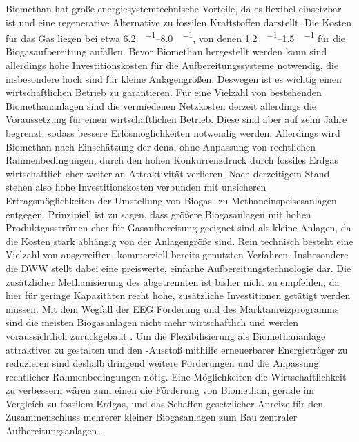 Biomethan hat große energiesystemtechnische Vorteile, da es flexibel einsetzbar ist und eine regenerative Alternative zu fossilen Kraftstoffen darstellt. Die Kosten für das Gas liegen bei etwa \SIrange{6,2}{8,0}{\ct\per\kwh}, von denen \SIrange{1,2}{1,5}{\ct\per\kwh} für die Biogasaufbereitung anfallen. Bevor Biomethan hergestellt werden kann sind allerdings hohe Investitionskosten für die Aufbereitungssysteme notwendig, die insbesondere hoch sind für kleine Anlagengrößen. Deswegen ist es wichtig einen wirtschaftlichen Betrieb zu garantieren. Für eine Vielzahl von bestehenden Biomethananlagen sind die vermiedenen Netzkosten derzeit allerdings die Voraussetzung für einen wirtschaftlichen Betrieb. Diese sind aber auf zehn Jahre begrenzt, sodass bessere Erlösmöglichkeiten notwendig werden. Allerdings wird Biomethan nach Einschätzung der dena, ohne Anpassung von rechtlichen Rahmenbedingungen, durch den hohen Konkurrenzdruck durch fossiles Erdgas wirtschaftlich eher weiter an Attraktivität verlieren.  \parencite{dena2018} \newline
Nach derzeitigem Stand stehen also hohe Investitionskosten verbunden mit unsicheren Ertragsmöglichkeiten der Umstellung von Biogas- zu Methaneinspeisesanlagen entgegen. Prinzipiell ist zu sagen, dass größere Biogasanlagen mit hohen Produktgasströmen eher für Gasaufbereitung geeignet sind als kleine Anlagen, da die Kosten stark abhängig von der Anlagengröße sind. Rein technisch besteht eine Vielzahl von ausgereiften, kommerziell bereits genutzten Verfahren. Insbesondere die \gls{DWW} stellt dabei eine preiswerte, einfache Aufbereitungstechnologie dar. Die zusätzlicher Methanisierung des abgetrennten  ist bisher nicht zu empfehlen, da hier für geringe Kapazitäten recht hohe, zusätzliche Investitionen getätigt werden müssen. \newline
Mit dem Wegfall der \gls{EEG} Förderung und des Marktanreizprogramms sind die meisten Biogasanlagen nicht mehr wirtschaftlich und werden voraussichtlich zurückgebaut \parencite{UmBA19}. Um die Flexibilisierung als Biomethananlage attraktiver zu gestalten und den -Ausstoß mithilfe erneuerbarer Energieträger zu reduzieren sind deshalb dringend weitere Förderungen und die Anpassung rechtlicher Rahmenbedingungen nötig. Eine Möglichkeiten die Wirtschaftlichkeit zu verbessern wären zum einen die Förderung von Biomethan, gerade im Vergleich zu fossilem Erdgas, und das Schaffen gesetzlicher Anreize für den Zusammenschluss mehrerer kleiner Biogasanlagen zum Bau zentraler Aufbereitungsanlagen \parencite{UmBA19}. 


